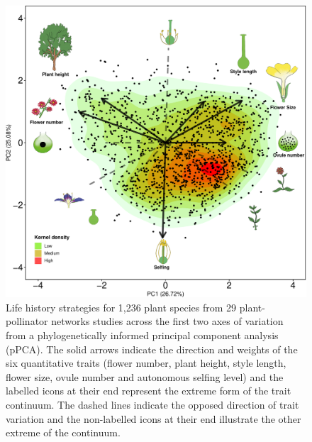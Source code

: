 \documentclass[11pt,a4paper,]{article}
\begin{document}
\begin{figure}
\centering
\includegraphics{output/figures/unnamed-chunk-2-1.pdf}
\caption{\label{fig:unnamed-chunk-2}Life history strategies for 1,236 plant
species from 29 plant-pollinator networks studies across the first two
axes of variation from a phylogenetically informed principal component
analysis (pPCA). The solid arrows indicate the direction and weights of
the six quantitative traits (flower number, plant height, style length,
flower size, ovule number and autonomous selfing level) and the labelled
icons at their end represent the extreme form of the trait continuum.
The dashed lines indicate the opposed direction of trait variation and
the non-labelled icons at their end illustrate the other extreme of the
continuum.}
\end{figure}
\end{document}
